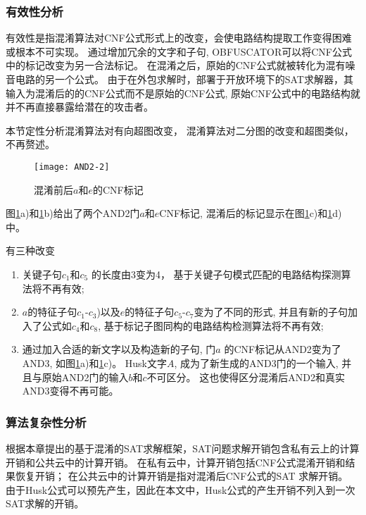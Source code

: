 \subsubsection{有效性分析}\label{3:effective}

有效性是指混淆算法对CNF公式形式上的改变，会使电路结构提取工作变得困难或根本不可实现。
通过增加冗余的文字和子句,
OBFUSCATOR可以将CNF公式中的标记改变为另一合法标记。
在混淆之后，原始的CNF公式就被转化为混有噪音电路的另一个公式。
由于在外包求解时，部署于开放环境下的SAT求解器，其输入为混淆后的的CNF公式而不是原始的CNF公式,
原始CNF公式中的电路结构就并不再直接暴露给潜在的攻击者。

本节定性分析混淆算法对有向超图改变，
混淆算法对二分图的改变和超图类似，不再赘述。

\begin{figure}[b]
\centering
\texttt{[image: AND2-2]}
\caption{混淆前后$a$和$e$的CNF标记}
\label{3:fig_beforeafter}
\end{figure}

图\ref{3:fig_beforeafter}a)和\ref{3:fig_beforeafter}b)给出了两个AND2门$a$和$e$CNF标记,
混淆后的标记显示在图\ref{3:fig_beforeafter}c)和\ref{3:fig_beforeafter}d)中。

有三种改变
\begin{enumerate}
 \item
 关键子句$c_1$和$c_5$ 的长度由3变为4，
基于关键子句模式匹配的电路结构探测算法\cite{csFu}将不再有效;
 \item
$a$的特征子句$c_1$-$c_3$)以及$e$的特征子句$c_5$-$c_7$变为了不同的形式,
并且有新的子句加入了公式如$c_4$和$c_8$,
基于标记子图同构的电路结构检测算法\cite{csRoy}将不再有效;
\item
 通过加入合适的新文字以及构造新的子句,
 门$a$ 的CNF标记从AND2变为了AND3,
如图\ref{3:fig_beforeafter}a)和\ref{3:fig_beforeafter}c)。
Husk文字$A$,
成为了新生成的AND3门的一个输入,
并且与原始AND2门的输入$b$和$c$不可区分。
这也使得区分混淆后AND2和真实AND3变得不再可能。
\end{enumerate}

\subsubsection{算法复杂性分析}
根据本章提出的基于混淆的SAT求解框架，SAT问题求解开销包含私有云上的计算开销和公共云中的计算开销。
在私有云中，计算开销包括CNF公式混淆开销和结果恢复开销；
在公共云中的计算开销是指对混淆后CNF公式的SAT 求解开销。
由于Husk公式可以预先产生，因此在本文中，Husk公式的产生开销不列入到一次SAT求解的开销。

